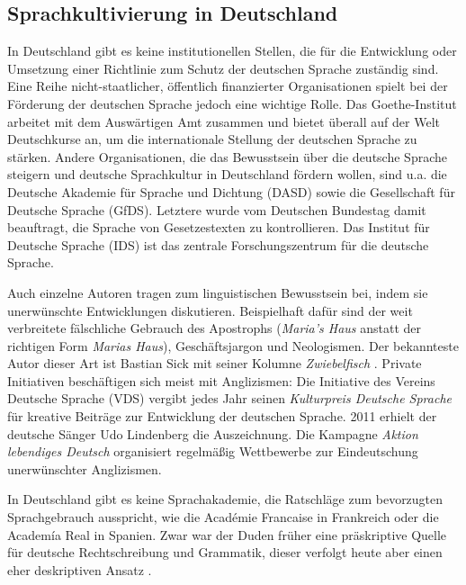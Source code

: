 \documentclass[]{../../metanetpaper}
\begin{document}
\begin{multicols}{2}
\subsection{Sprachkultivierung in Deutschland}

In Deutschland gibt es keine institutionellen Stellen, die für die Entwicklung oder Umsetzung einer Richtlinie zum Schutz der deutschen Sprache zuständig sind. Eine Reihe nicht-staatlicher, öffentlich finanzierter Organisationen spielt bei der Förderung der deutschen Sprache jedoch eine wichtige Rolle. Das Goethe-Institut arbeitet mit dem Auswärtigen Amt zusammen und bietet überall auf der Welt Deutschkurse an, um die internationale Stellung der deutschen Sprache zu stärken. Andere Organisationen, die das Bewusstsein über die deutsche Sprache steigern und deutsche Sprachkultur in Deutschland fördern wollen, sind u.a. die Deutsche Akademie für Sprache und Dichtung (DASD) sowie die Gesellschaft für Deutsche Sprache (GfDS). Letztere wurde vom Deutschen Bundestag damit beauftragt, die Sprache von Gesetzestexten zu kontrollieren. Das Institut für Deutsche Sprache (IDS) ist das zentrale Forschungszentrum für die deutsche Sprache. 


Auch einzelne Autoren tragen zum linguistischen Bewusstsein bei, indem sie unerwünschte Entwicklungen diskutieren. Beispielhaft dafür sind der weit verbreitete fälschliche Gebrauch des Apostrophs (\textit{Maria’s Haus} anstatt der richtigen Form \textit{Marias Haus}), Geschäftsjargon und Neologismen. Der bekannteste Autor dieser Art ist Bastian Sick \cite{Sick1} mit seiner Kolumne \textit{Zwiebelfisch} \cite{Sick2}. Private Initiativen beschäftigen sich meist mit Anglizismen: Die Initiative des Vereins Deutsche Sprache (VDS) vergibt jedes Jahr seinen \textit{Kulturpreis Deutsche Sprache} für kreative Beiträge zur Entwicklung der deutschen Sprache. 2011 erhielt der deutsche Sänger Udo Lindenberg die Auszeichnung. Die Kampagne \textit{Aktion lebendiges Deutsch} organisiert regelmäßig Wettbewerbe zur Eindeutschung unerwünschter Anglizismen. 

In Deutschland gibt es keine Sprachakademie, die Ratschläge zum bevorzugten Sprachgebrauch ausspricht, wie die Académie Francaise in Frankreich oder die Academía Real in Spanien. Zwar war der Duden früher eine präskriptive Quelle für deutsche Rechtschreibung und Grammatik, dieser verfolgt heute aber einen eher deskriptiven Ansatz \cite{Schn1}. 


\end{multicols}
\end{document}
